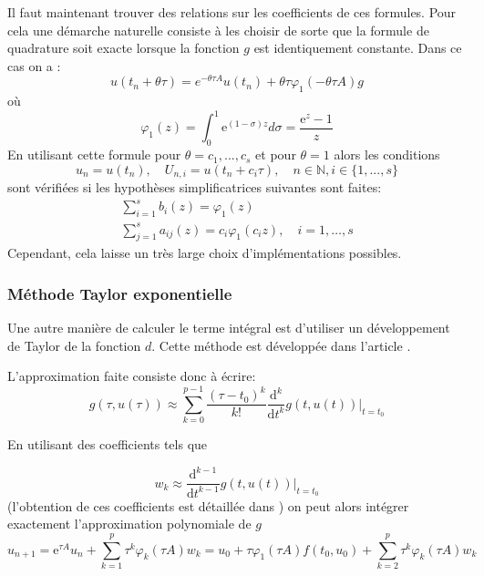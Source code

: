 Il faut maintenant trouver des relations sur les coefficients de ces formules. Pour cela une démarche naturelle consiste à les choisir de sorte que la formule de quadrature soit exacte lorsque la fonction $g$ est identiquement constante. Dans ce cas on a :
\begin{equation} 
    u\left(t_{n}+\theta \tau\right)=e^{-\theta \tau A} u\left(t_{n}\right)+\theta \tau \varphi_{1}(-\theta \tau A) g
\end{equation}
où
\begin{equation} 
    \varphi_{1}(z)=\int_{0}^{1} \mathrm{e}^{(1-\sigma) z} d \sigma=\frac{\mathrm{e}^{z}-1}{z}
\end{equation}
En utilisant cette formule pour $\theta = c_1,...,c_s$ et pour $\theta = 1$ alors les conditions
$$
u_n = u(t_n),\quad U_{n,i} = u(t_n+c_i \tau), \quad n\in \mathbb{N}, i\in\{1,...,s\}
$$
sont vérifiées si les hypothèses simplificatrices suivantes sont faites:
\begin{equation} 
    \begin{array}{l}{\sum_{i=1}^{s} b_{i}(z)=\varphi_{1}(z)} \\ {\sum_{j=1}^{s} a_{i j}(z)=c_{i} \varphi_{1}\left(c_{i} z\right), \quad i=1, \ldots, s}\end{array}
\end{equation}
Cependant, cela laisse un très large choix d'implémentations possibles.
\subsubsection{Méthode Taylor exponentielle}

Une autre manière de calculer le terme intégral est d'utiliser un développement de Taylor de la fonction $d$. Cette méthode est développée dans l'article \cite{Taylor}.

L'approximation faite consiste donc à écrire:
\begin{equation} 
    g(\tau, u(\tau)) \approx \sum_{k=0}^{p-1} \frac{\left(\tau-t_{0}\right)^{k}}{k !} \frac{\mathrm{d}^{k}}{\mathrm{d} t^{k}} g\left.(t, u(t))\right|_{t=t_{0}}
\end{equation}

En utilisant des coefficients tels que

\begin{equation} 
    w_{k} \approx \frac{\mathrm{d}^{k-1}}{\mathrm{d} t^{k-1}} g\left.(t, u(t))\right|_{t=t_{0}}
\end{equation}
(l'obtention de ces coefficients est détaillée dans \cite{Taylor}) on peut alors intégrer exactement l'approximation polynomiale de $g$
\begin{equation} 
    u_{n+1}=\mathrm{e}^{\tau A} u_{n}+\sum_{k=1}^{p} \tau^{k} \varphi_{k}(\tau A) w_{k} = u_{0}+\tau \varphi_{1}(\tau A) f\left(t_{0}, u_{0}\right)+\sum_{k=2}^{p} \tau^{k} \varphi_{k}(\tau A) w_{k}
\end{equation}

